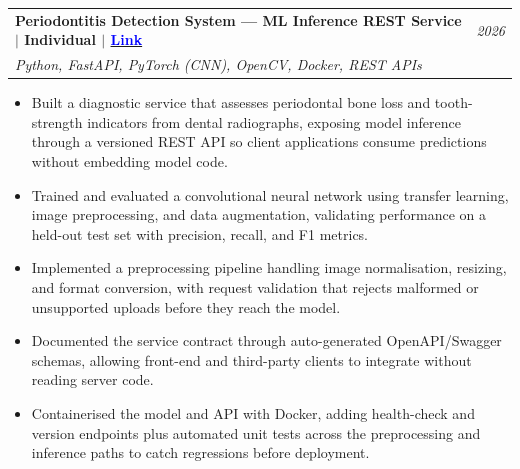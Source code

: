 \documentclass[a4paper,11pt]{article}
\makeatletter
\newcommand{\resumeProject}[4]{
\vspace{0.5mm}\item
    \begin{tabular*}{0.98\textwidth}[t]{l@{\extracolsep{\fill}}r}
        \textbf{#1} & \textit{\footnotesize{#3}} \\
        \footnotesize{\textit{#2}} & \footnotesize{#4}
    \end{tabular*}
    \vspace{-2.4mm}
}
\newcommand{\resumeItemListStart}{\begin{justify}\begin{itemize}[label=$\bullet$, leftmargin=3.4ex, rightmargin=1ex, noitemsep, labelsep=1.4mm, itemsep=0.35mm, topsep=0.6mm]\small}
\newcommand{\resumeItemListEnd}{\end{itemize}\end{justify}\vspace{-2mm}}
\makeatother
\begin{document}
  \resumeProject
    {Periodontitis Detection System --- ML Inference REST Service $\vert$ Individual $\vert$ \href{https://github.com/sashankbanda/tooth-strength-detector.git}{\textcolor{blue}{Link}}}
    {Python, FastAPI, PyTorch (CNN), OpenCV, Docker, REST APIs}
    {2026}
    {}
  \vspace{-1.0mm}
  \resumeItemListStart
    \justifying
    \item Built a diagnostic service that assesses periodontal bone loss and tooth-strength indicators from dental radiographs, exposing model inference through a versioned REST API so client applications consume predictions without embedding model code.
    \item Trained and evaluated a convolutional neural network using transfer learning, image preprocessing, and data augmentation, validating performance on a held-out test set with precision, recall, and F1 metrics. %
    \item Implemented a preprocessing pipeline handling image normalisation, resizing, and format conversion, with request validation that rejects malformed or unsupported uploads before they reach the model. %
    \item Documented the service contract through auto-generated OpenAPI/Swagger schemas, allowing front-end and third-party clients to integrate without reading server code. %
    \item Containerised the model and API with Docker, adding health-check and version endpoints plus automated unit tests across the preprocessing and inference paths to catch regressions before deployment.
  \resumeItemListEnd
  \vspace{-4mm}
\end{document}

